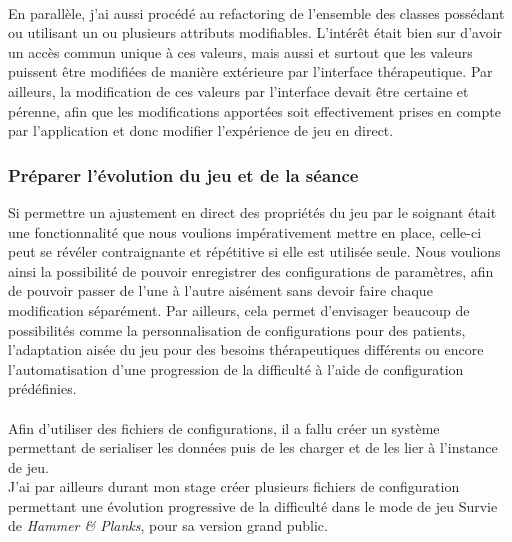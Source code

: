 \paragraph{}
En parallèle, j'ai aussi procédé au refactoring de l'ensemble des classes possédant ou utilisant un ou plusieurs attributs modifiables. L'intérêt était bien sur d'avoir un accès commun unique à ces valeurs, mais aussi et surtout que les valeurs puissent être modifiées de manière extérieure par l'interface thérapeutique. Par ailleurs, la modification de ces valeurs par l'interface devait être certaine et pérenne, afin que les modifications apportées soit effectivement prises en compte par l'application et donc modifier l'expérience de jeu en direct.

	\subsubsection*{Préparer l'évolution du jeu et de la séance}
Si permettre un ajustement en direct des propriétés du jeu par le soignant était une fonctionnalité que nous voulions impérativement mettre en place, celle-ci peut se révéler contraignante et répétitive si elle est utilisée seule. Nous voulions ainsi la possibilité de pouvoir enregistrer des configurations de paramètres, afin de pouvoir passer de l'une à l'autre aisément sans devoir faire chaque modification séparément. Par ailleurs, cela permet d'envisager beaucoup de possibilités comme la personnalisation de configurations pour des patients, l'adaptation aisée du jeu pour des besoins thérapeutiques différents ou encore l'automatisation d'une progression de la difficulté à l'aide de configuration prédéfinies.

\paragraph{}Afin d'utiliser des fichiers de configurations, il a fallu créer un système permettant de serialiser les données puis de les charger et de les lier à l'instance de jeu.\\
J'ai par ailleurs durant mon stage créer plusieurs fichiers de configuration permettant une évolution progressive de la difficulté dans le mode de jeu Survie de \emph{Hammer \& Planks}, pour sa version grand public.

